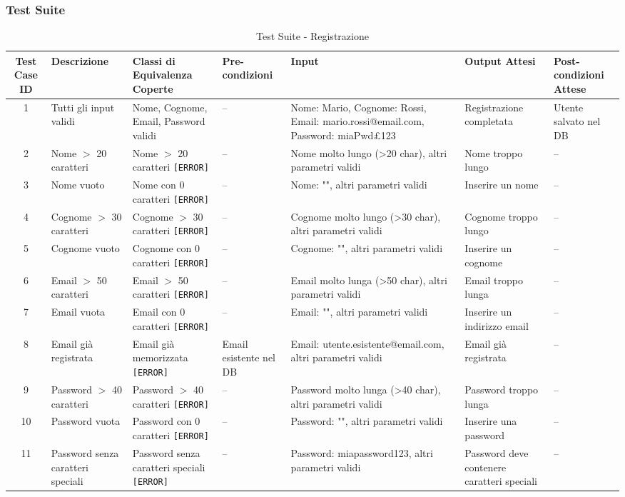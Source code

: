 \subsubsection*{Test Suite}

\begin{table}[H]
	\centering
	\tiny
	\renewcommand{\arraystretch}{1.4}
	\begin{tabular}{|c|p{2.5cm}|p{2.8cm}|p{1.5cm}|p{2.8cm}|p{2cm}|p{1.8cm}|}
		\hline
		\textbf{Test Case ID} & \textbf{Descrizione} & \textbf{Classi di Equivalenza Coperte} & \textbf{Pre-condizioni} & \textbf{Input} & \textbf{Output Attesi} & \textbf{Post-condizioni Attese} \\
		\hline
		1 & Tutti gli input validi & Nome, Cognome, Email, Password validi & -- &
		Nome: Mario, Cognome: Rossi, Email: mario.rossi@email.com, Password: miaPwd£123 &
		Registrazione completata & Utente salvato nel DB \\
		\hline
		2 & Nome $>$ 20 caratteri & Nome $>$ 20 caratteri \texttt{[ERROR]} & -- &
		Nome molto lungo (>20 char), altri parametri validi &
		Nome troppo lungo & -- \\
		\hline
		3 & Nome vuoto & Nome con 0 caratteri \texttt{[ERROR]} & -- &
		Nome: "", altri parametri validi &
		Inserire un nome & -- \\
		\hline
		4 & Cognome $>$ 30 caratteri & Cognome $>$ 30 caratteri \texttt{[ERROR]} & -- &
		Cognome molto lungo (>30 char), altri parametri validi &
		Cognome troppo lungo & -- \\
		\hline
		5 & Cognome vuoto & Cognome con 0 caratteri \texttt{[ERROR]} & -- &
		Cognome: "", altri parametri validi &
		Inserire un cognome & -- \\
		\hline
		6 & Email $>$ 50 caratteri & Email $>$ 50 caratteri \texttt{[ERROR]} & -- &
		Email molto lunga (>50 char), altri parametri validi &
		Email troppo lunga & -- \\
		\hline
		7 & Email vuota & Email con 0 caratteri \texttt{[ERROR]} & -- &
		Email: "", altri parametri validi &
		Inserire un indirizzo email & -- \\
		\hline
		8 & Email già registrata & Email già memorizzata \texttt{[ERROR]} & Email esistente nel DB &
		Email: utente.esistente@email.com, altri parametri validi &
		Email già registrata & -- \\
		\hline
		9 & Password $>$ 40 caratteri & Password $>$ 40 caratteri \texttt{[ERROR]} & -- &
		Password molto lunga (>40 char), altri parametri validi &
		Password troppo lunga & -- \\
		\hline
		10 & Password vuota & Password con 0 caratteri \texttt{[ERROR]} & -- &
		Password: "", altri parametri validi &
		Inserire una password & -- \\
		\hline
		11 & Password senza caratteri speciali & Password senza caratteri speciali \texttt{[ERROR]} & -- &
		Password: miapassword123, altri parametri validi &
		Password deve contenere caratteri speciali & -- \\
		\hline
	\end{tabular}
	\caption{Test Suite - Registrazione}
\end{table}